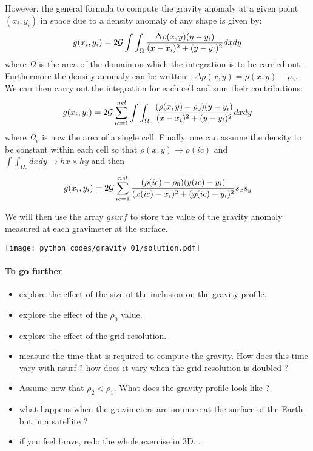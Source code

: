 However, the general formula to compute the gravity anomaly at a given point $(x_i,y_i)$ in space 
due to a density anomaly of any shape is given by:
\begin{equation}
g(x_i,y_i) = 2 {\cal G} \int\int_\Omega \frac{ \Delta \rho(x,y)  (y-y_i)}{(x-x_i)^2 + (y-y_i)^2  } dxdy
\end{equation}
where $\Omega$ is the area of the domain on which the integration is to be carried out. 
Furthermore the density anomaly can be written : $\Delta \rho (x,y)= \rho(x,y)-\rho_0$.
We can then carry out the integration for each cell and sum their contributions:
\begin{equation}
g(x_i,y_i) = 2 {\cal G} \sum_{ic=1}^{nel} \int\int_{\Omega_e} \frac{ (\rho(x,y) -\rho_0)  (y-y_i)}{(x-x_i)^2 + (y-y_i)^2  } dxdy
\end{equation}
where $\Omega_e$ is now the area of a single cell.
Finally, one can assume the density to be constant within each cell so that $\rho(x,y)\rightarrow \rho(ic)$
and $\int\int_{\Omega_e} dx dy \rightarrow hx \times hy$ and then 
\begin{equation}
g(x_i,y_i) = 2 {\cal G} \sum_{ic=1}^{nel} \frac{ (\rho(ic) -\rho_0)  (y(ic)-y_i)}{(x(ic)-x_i)^2 + (y(ic)-y_i)^2  } s_xs_y
\end{equation}

We will then use the array $gsurf$ to store the value of the gravity anomaly 
measured at each gravimeter at the surface. 

\begin{center}
\texttt{[image: python\_codes/gravity\_01/solution.pdf]}
\end{center}


\paragraph{To go further}

\begin{itemize}
\item explore the effect of the size of the inclusion on the gravity profile.
\item explore the effect of the $\rho_0$ value.
\item explore the effect of the grid resolution.
\item measure the time that is required to compute the gravity. 
How does this time vary with nsurf ? how does it vary when the grid resolution is doubled ?
\item Assume now that $\rho_2<\rho_1$. What does the gravity profile look like ?
\item what happens when the gravimeters are no more at the surface of the Earth but in a satellite ?
\item if you feel brave, redo the whole exercise in 3D...
\end{itemize}

